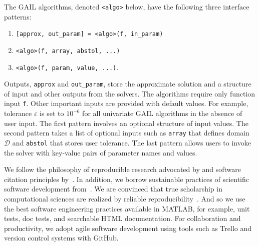 The GAIL algorithms, denoted \texttt{<algo>} below, have the following
three interface patterns:  
\begin{enumerate}  [label=\roman*.]
\item \texttt{[approx, out\_param] = <algo>(f, in\_param)} 
\item \texttt{<algo>(f, array, abstol, ...)} 
\item \texttt{<algo>(f, \textquotesingle param\textquotesingle, value, ...)}.
\end{enumerate}
Outputs, \texttt{approx} and \texttt{out\_param}, store the approximate
solution and a structure of input and other outputs from the solvers. The
algorithms require only function input \texttt{f}. Other important inputs
are provided with default values. 
For example, tolerance $\varepsilon$ is
set to $10^{-6}$ for all univariate GAIL algorithms in the absence of user input. 
The first pattern involves
an optional structure of input values. The second pattern takes a list of
optional inputs such as \texttt{array} that defines domain $\mathcal{D}$
and \texttt{abstol} that stores user tolerance. The last pattern allows
users to invoke the solver with key-value pairs of parameter names and
values.


We follow the philosophy of reproducible research advocated by \cite{SEP1, 
BD95} and software citation principles by~\cite{smith2016software}.
In addition, we borrow sustainable practices of scientific software
development from~\cite{KCNN15,KCWH16,KCLM14}. We are convinced that true
scholarship in computational sciences are realized by reliable
reproducibility~\cite{C14a,CH13}. And so we use the best software
engineering practices available in MATLAB, for example,  unit tests, doc
tests, and searchable HTML documentation. For collaboration and
productivity, we adopt agile software development using tools such as
Trello and version control systems with GitHub. 

